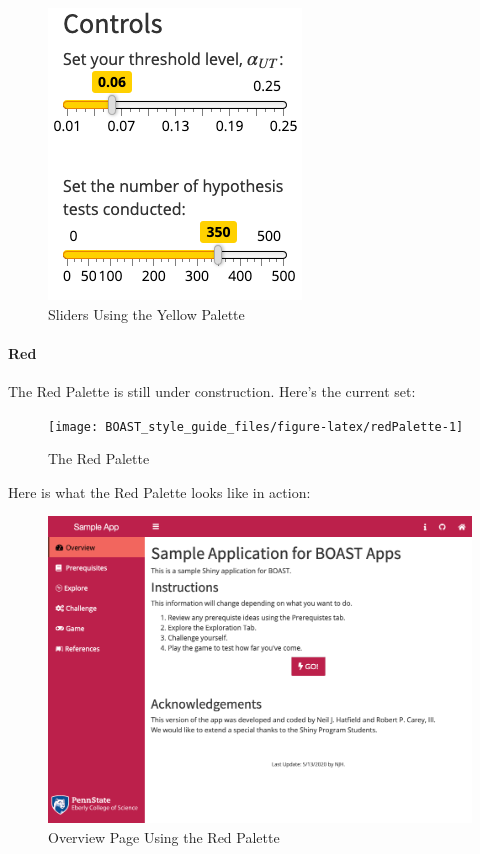 \documentclass[
]{book}
\begin{document}
\begin{figure}

{\centering \includegraphics{images/yellowSliders} 

}

\caption{Sliders Using the Yellow Palette}\label{fig:yellowAction3}
\end{figure}

\hypertarget{red}{%
\paragraph{Red}\label{red}}

The Red Palette is still under construction. Here's the current set:

\begin{figure}

{\centering \texttt{[image: BOAST\_style\_guide\_files/figure-latex/redPalette-1]} 

}

\caption{The Red Palette}\label{fig:redPalette}
\end{figure}

Here is what the Red Palette looks like in action:

\begin{figure}

{\centering \includegraphics[width=14in]{images/redOverview} 

}

\caption{Overview Page Using the Red Palette}\label{fig:redAction1}
\end{figure}
\end{document}
